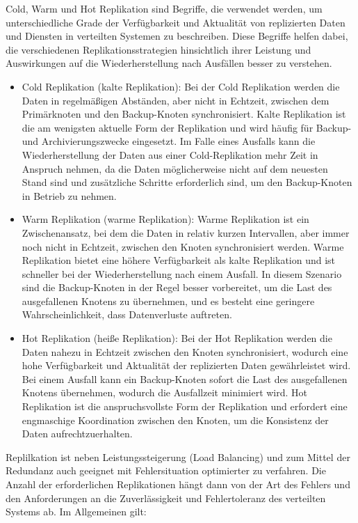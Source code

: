 Cold, Warm und Hot Replikation sind Begriffe, die verwendet werden, um unterschiedliche Grade der Verfügbarkeit und Aktualität von replizierten Daten und Diensten in verteilten Systemen zu beschreiben. Diese Begriffe helfen dabei, die verschiedenen Replikationsstrategien hinsichtlich ihrer Leistung und Auswirkungen auf die Wiederherstellung nach Ausfällen besser zu verstehen.
\begin{itemize}
\item Cold Replikation (kalte Replikation): Bei der Cold Replikation werden die Daten in regelmäßigen Abständen, aber nicht in Echtzeit, zwischen dem Primärknoten und den Backup-Knoten synchronisiert. Kalte Replikation ist die am wenigsten aktuelle Form der Replikation und wird häufig für Backup- und Archivierungszwecke eingesetzt. Im Falle eines Ausfalls kann die Wiederherstellung der Daten aus einer Cold-Replikation mehr Zeit in Anspruch nehmen, da die Daten möglicherweise nicht auf dem neuesten Stand sind und zusätzliche Schritte erforderlich sind, um den Backup-Knoten in Betrieb zu nehmen.
\item Warm Replikation (warme Replikation): Warme Replikation ist ein Zwischenansatz, bei dem die Daten in relativ kurzen Intervallen, aber immer noch nicht in Echtzeit, zwischen den Knoten synchronisiert werden. Warme Replikation bietet eine höhere Verfügbarkeit als kalte Replikation und ist schneller bei der Wiederherstellung nach einem Ausfall. In diesem Szenario sind die Backup-Knoten in der Regel besser vorbereitet, um die Last des ausgefallenen Knotens zu übernehmen, und es besteht eine geringere Wahrscheinlichkeit, dass Datenverluste auftreten.
\item Hot Replikation (heiße Replikation): Bei der Hot Replikation werden die Daten nahezu in Echtzeit zwischen den Knoten synchronisiert, wodurch eine hohe Verfügbarkeit und Aktualität der replizierten Daten gewährleistet wird. Bei einem Ausfall kann ein Backup-Knoten sofort die Last des ausgefallenen Knotens übernehmen, wodurch die Ausfallzeit minimiert wird. Hot Replikation ist die anspruchsvollste Form der Replikation und erfordert eine engmaschige Koordination zwischen den Knoten, um die Konsistenz der Daten aufrechtzuerhalten.
\end{itemize}
Replilkation ist neben Leistungssteigerung (Load Balancing) und zum Mittel der Redundanz auch geeignet mit Fehlersituation optimierter zu verfahren.
Die Anzahl der erforderlichen Replikationen hängt dann von der Art des Fehlers und den Anforderungen an die Zuverlässigkeit und Fehlertoleranz des verteilten Systems ab. Im Allgemeinen gilt: 
